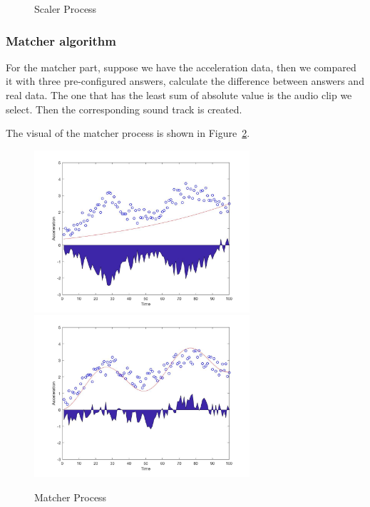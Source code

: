 \begin{figure}[htbp]
\caption{Scaler Process}
\label{scalerStep}
\end{figure}

\subsubsection{Matcher algorithm}

   For the matcher part, suppose we have the acceleration data,
   then we compared it with three pre-configured answers,
   calculate the difference between answers and real data.
   The one that has the least sum of absolute value is the audio clip we select.
   Then the corresponding sound track is created.

   The visual of the matcher process is shown in Figure~\ref{matcherStep}.

\begin{figure}[htbp]
\centering
\newcommand{\widthOfMatcherFigure}{8cm}
\includegraphics[width=\widthOfMatcherFigure]{figWR/matcher1}
\includegraphics[width=\widthOfMatcherFigure]{figWR/matcher2}
\caption{Matcher Process}
\label{matcherStep}
\end{figure}

